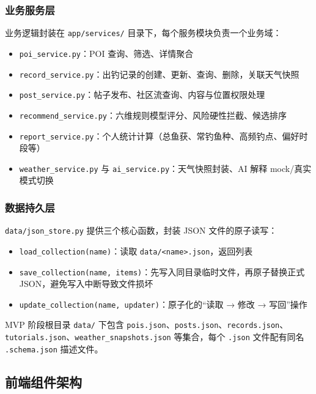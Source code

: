 \subsubsection{业务服务层}

业务逻辑封装在 \texttt{app/services/} 目录下，每个服务模块负责一个业务域：

\begin{itemize}
  \item \texttt{poi\_service.py}：POI 查询、筛选、详情聚合
  \item \texttt{record\_service.py}：出钓记录的创建、更新、查询、删除，关联天气快照
  \item \texttt{post\_service.py}：帖子发布、社区流查询、内容与位置权限处理
  \item \texttt{recommend\_service.py}：六维规则模型评分、风险硬性拦截、候选排序
  \item \texttt{report\_service.py}：个人统计计算（总鱼获、常钓鱼种、高频钓点、偏好时段等）
  \item \texttt{weather\_service.py} 与 \texttt{ai\_service.py}：天气快照封装、AI 解释 mock/真实模式切换
\end{itemize}

\subsubsection{数据持久层}

\texttt{data/json\_store.py} 提供三个核心函数，封装 JSON 文件的原子读写：

\begin{itemize}
  \item \texttt{load\_collection(name)}：读取 \texttt{data/<name>.json}，返回列表
  \item \texttt{save\_collection(name, items)}：先写入同目录临时文件，再原子替换正式 JSON，避免写入中断导致文件损坏
  \item \texttt{update\_collection(name, updater)}：原子化的“读取 → 修改 → 写回”操作
\end{itemize}

MVP 阶段根目录 \texttt{data/} 下包含 \texttt{pois.json}、\texttt{posts.json}、\texttt{records.json}、\texttt{tutorials.json}、\texttt{weather\_snapshots.json} 等集合，每个 \texttt{.json} 文件配有同名 \texttt{.schema.json} 描述文件。

\subsection{前端组件架构}

